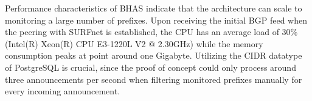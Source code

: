 Performance characteristics of BHAS indicate that the architecture can scale to monitoring a large number of prefixes. Upon receiving the initial BGP feed when the peering with SURFnet is established, the CPU has an average load of 30\% (Intel(R) Xeon(R) CPU E3-1220L V2 @ 2.30GHz) while the memory consumption peaks at point around one Gigabyte. Utilizing the CIDR datatype of PostgreSQL is crucial, since the proof of concept could only process around three announcements per second when filtering monitored prefixes manually for every incoming announcement.\par
